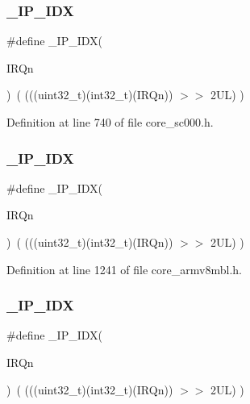 \subsubsection{\texorpdfstring{\+\_\+\+I\+P\+\_\+\+I\+DX}{\_IP\_IDX}\hspace{0.1cm}{\footnotesize\ttfamily [4/6]}}
{\footnotesize\ttfamily \#define \+\_\+\+I\+P\+\_\+\+I\+DX(\begin{DoxyParamCaption}\item[{}]{I\+R\+Qn }\end{DoxyParamCaption})~(   (((uint32\+\_\+t)(int32\+\_\+t)(I\+R\+Qn))                $>$$>$    2\+U\+L)      )}



Definition at line 740 of file core\+\_\+sc000.\+h.

\mbox{\label{group___c_m_s_i_s___core___n_v_i_c_functions_ga370ec4b1751a6a889d849747df3763a9}} 
\subsubsection{\texorpdfstring{\+\_\+\+I\+P\+\_\+\+I\+DX}{\_IP\_IDX}\hspace{0.1cm}{\footnotesize\ttfamily [5/6]}}
{\footnotesize\ttfamily \#define \+\_\+\+I\+P\+\_\+\+I\+DX(\begin{DoxyParamCaption}\item[{}]{I\+R\+Qn }\end{DoxyParamCaption})~(   (((uint32\+\_\+t)(int32\+\_\+t)(I\+R\+Qn))                $>$$>$    2\+U\+L)      )}



Definition at line 1241 of file core\+\_\+armv8mbl.\+h.

\mbox{\label{group___c_m_s_i_s___core___n_v_i_c_functions_ga370ec4b1751a6a889d849747df3763a9}} 
\subsubsection{\texorpdfstring{\+\_\+\+I\+P\+\_\+\+I\+DX}{\_IP\_IDX}\hspace{0.1cm}{\footnotesize\ttfamily [6/6]}}
{\footnotesize\ttfamily \#define \+\_\+\+I\+P\+\_\+\+I\+DX(\begin{DoxyParamCaption}\item[{}]{I\+R\+Qn }\end{DoxyParamCaption})~(   (((uint32\+\_\+t)(int32\+\_\+t)(I\+R\+Qn))                $>$$>$    2\+U\+L)      )}



